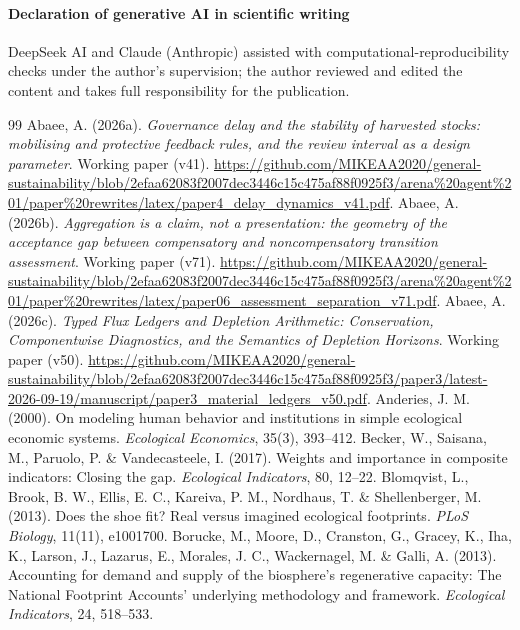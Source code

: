 \documentclass[preprint,12pt,authoryear]{elsarticle}
\begin{document}
\paragraph{Declaration of generative AI in scientific writing} DeepSeek AI and Claude (Anthropic) assisted with computational-reproducibility checks under the author's supervision; the author reviewed and edited the content and takes full responsibility for the publication.
\begin{thebibliography}{99}
 Abaee, A. (2026a). \emph{Governance delay and the stability of harvested stocks: mobilising and protective feedback rules, and the review interval as a design parameter}. Working paper (v41). \url{https://github.com/MIKEAA2020/general-sustainability/blob/2efaa62083f2007dec3446c15c475af88f0925f3/arena%20agent%201/paper%20rewrites/latex/paper4_delay_dynamics_v41.pdf}.
 Abaee, A. (2026b). \emph{Aggregation is a claim, not a presentation: the geometry of the acceptance gap between compensatory and noncompensatory transition assessment}. Working paper (v71). \url{https://github.com/MIKEAA2020/general-sustainability/blob/2efaa62083f2007dec3446c15c475af88f0925f3/arena%20agent%201/paper%20rewrites/latex/paper06_assessment_separation_v71.pdf}.
 Abaee, A. (2026c). \emph{Typed Flux Ledgers and Depletion Arithmetic: Conservation, Componentwise Diagnostics, and the Semantics of Depletion Horizons}. Working paper (v50). \url{https://github.com/MIKEAA2020/general-sustainability/blob/2efaa62083f2007dec3446c15c475af88f0925f3/paper3/latest-2026-09-19/manuscript/paper3_material_ledgers_v50.pdf}.
 Anderies, J. M. (2000). On modeling human behavior and institutions in simple ecological economic systems. \emph{Ecological Economics}, 35(3), 393--412.
 Becker, W., Saisana, M., Paruolo, P. \& Vandecasteele, I. (2017). Weights and importance in composite indicators: Closing the gap. \emph{Ecological Indicators}, 80, 12--22.
 Blomqvist, L., Brook, B. W., Ellis, E. C., Kareiva, P. M., Nordhaus, T. \& Shellenberger, M. (2013). Does the shoe fit? Real versus imagined ecological footprints. \emph{PLoS Biology}, 11(11), e1001700.
 Borucke, M., Moore, D., Cranston, G., Gracey, K., Iha, K., Larson, J., Lazarus, E., Morales, J. C., Wackernagel, M. \& Galli, A. (2013). Accounting for demand and supply of the biosphere's regenerative capacity: The National Footprint Accounts' underlying methodology and framework. \emph{Ecological Indicators}, 24, 518--533.

\end{thebibliography}
\end{document}

